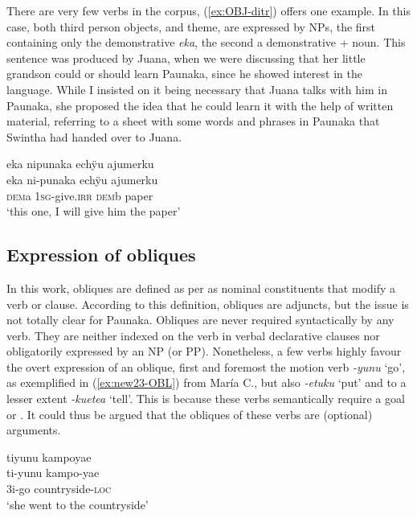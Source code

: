 There are very few  verbs in the corpus, (\ref{ex:OBJ-ditr}) offers one example. In this case, both third person objects,  and theme, are expressed by NPs, the first containing only the demonstrative \textit{eka}, the second a demonstrative + noun. This sentence was produced by Juana, when we were discussing that her little grandson could or should learn Paunaka, since he showed interest in the language. While I insisted on it being necessary that Juana talks with him in Paunaka, she proposed the idea that he could learn it with the help of written material, referring to a sheet with some words and phrases in Paunaka that Swintha had handed over to Juana.

\ea\label{ex:OBJ-ditr}
\begingl
\glpreamble eka nipunaka echÿu ajumerku\\
\gla eka ni-punaka echÿu ajumerku\\
\glb \textsc{dem}a 1\textsc{sg}-give.\textsc{irr} \textsc{dem}b paper\\
\glft ‘this one, I will give him the paper’
\endgl
\trailingcitation{[jxx-e110923l-1.102]}
\xe



\subsection{Expression of obliques}\label{sec:DeclClausesOBL}

In this work, obliques are defined as per \citet[]{wals-84} as nominal constituents that modify a verb or clause. According to this definition, obliques are adjuncts, but the issue is not totally clear for Paunaka. Obliques are never required syntactically by any verb. They are neither indexed on the verb in verbal declarative clauses nor obligatorily expressed by an NP (or PP). Nonetheless, a few verbs highly favour the overt expression of an oblique, first and foremost the motion verb \textit{-yunu} ‘go’, as exemplified in (\ref{ex:new23-OBL}) from María C., but also \textit{-etuku} ‘put’ and to a lesser extent \textit{-kuetea} ‘tell’. This is because these verbs semantically require a goal or . It could thus be argued that the obliques of these verbs are (optional) arguments.

\ea\label{ex:new23-OBL}
\begingl
\glpreamble tiyunu kampoyae\\
\gla ti-yunu kampo-yae\\
\glb 3i-go countryside-\textsc{loc}\\
\glft ‘she went to the countryside’
\endgl
\trailingcitation{[cux-c120510l-1.205]}
\xe

